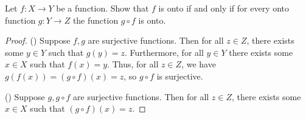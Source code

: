 \documentclass[class=article, crop=false]{standalone}
\begin{document}
  \begin{problem}{3}
    Let $f\colon X\to Y$ be a function. Show that $f$ is onto if and only if for every onto function $g\colon Y\to Z$ the function $g\circ f$ is onto.
  \end{problem}
  \begin{proof}
    (\Rightarrow) Suppose $f, g$ are surjective functions. Then for all $z\in Z$, there exists some $y\in Y$ such that $g(y) = z$. Furthermore, for all $y\in Y$ there exists some $x\in X$ such that $f(x) = y$. Thus, for all $z\in Z$, we have $g(f(x)) = (g\circ f)(x) = z$, so $g\circ f$ is surjective. \par
    (\Leftarrow) Suppose $g, g\circ f$ are surjective functions. Then for all $z\in Z$, there exists some $x\in X$ such that $(g\circ f)(x) = z$.
  \end{proof}
\end{document}
